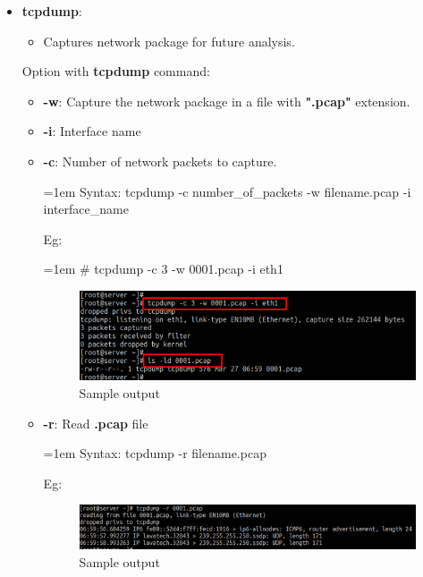 \begin{flushleft}
\begin{itemize}
\begin{itemize}
	\end{itemize}
	\newpage
	\item \textbf{tcpdump}: 
	\begin{itemize}
		\item Captures network package for future analysis.
	\end{itemize}
	\bigskip
	Option with \textbf{tcpdump} command:
	\begin{itemize}
		\item \textbf{-w}: Capture the network package in a file with \textbf{".pcap"} extension.
		\item \textbf{-i}: Interface name
		\item \textbf{-c}: Number of network packets to capture.
		\begin{tcolorbox}[breakable,notitle,boxrule=0pt,colback=pink,colframe=pink]
			\color{black}
			\font=1em
			Syntax: tcpdump -c number\_of\_packets -w filename.pcap  -i interface\_name
			\font=4pt
		\end{tcolorbox}
		Eg:
		\begin{tcolorbox}[breakable,notitle,boxrule=-0pt,colback=black,colframe=black]
			\color{green}
			\font=1em
			\# tcpdump -c 3 -w 0001.pcap -i eth1
			\font=4pt
		\end{tcolorbox}
		\begin{figure}[h!]
			\centering
			\includegraphics[scale=0.35]{content/chapter15/images/tcpdump_1.png}
			\caption{Sample output}
			\label{fig:output7}
		\end{figure}
	
		\item \textbf{-r}: Read \textbf{.pcap} file
		\begin{tcolorbox}[breakable,notitle,boxrule=0pt,colback=pink,colframe=pink]
			\color{black}
			\font=1em
			Syntax: tcpdump -r filename.pcap
			\font=4pt
		\end{tcolorbox}
		Eg:
		\begin{figure}[h!]
			\centering
			\includegraphics[scale=0.25]{content/chapter15/images/tcpdump_2.png}
			\caption{Sample output}
			\label{fig:output8}
		\end{figure}
		

\end{itemize}
\end{itemize}
\end{flushleft}
